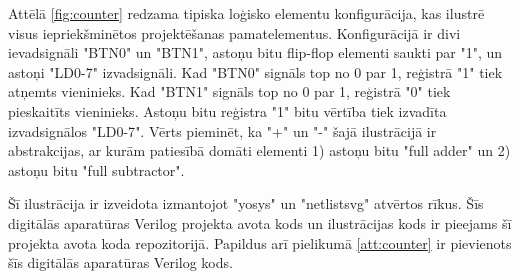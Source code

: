 Attēlā \ref{fig:counter} redzama tipiska loģisko elementu konfigurācija, kas
ilustrē visus iepriekšminētos projektēšanas pamatelementus. Konfigurācijā ir
divi ievadsignāli "BTN0" un "BTN1", astoņu bitu flip-flop elementi saukti par
"1", un astoņi "LD{0-7}" izvadsignāli. Kad "BTN0" signāls top no 0 par 1,
reģistrā "1" tiek atņemts vieninieks. Kad "BTN1" signāls top no 0 par 1,
reģistrā "0" tiek pieskaitīts vieninieks. Astoņu bitu reģistra "1" bitu vērtība
tiek izvadīta izvadsignālos "LD{0-7}". Vērts pieminēt, ka "+" un "-" šajā
ilustrācijā ir abstrakcijas, ar kurām patiesībā domāti elementi 1) astoņu bitu
"full adder" un 2) astoņu bitu "full subtractor".

Šī ilustrācija ir izveidota izmantojot "yosys" un "netlistsvg" atvērtos rīkus.
Šīs digitālās aparatūras Verilog projekta avota kods un ilustrācijas kods ir
pieejams šī projekta avota koda repozitorijā. \cite{VeinbahsKrisjanisTestbed}
Papildus arī pielikumā \ref{att:counter} ir pievienots šīs digitālās aparatūras
Verilog kods.
